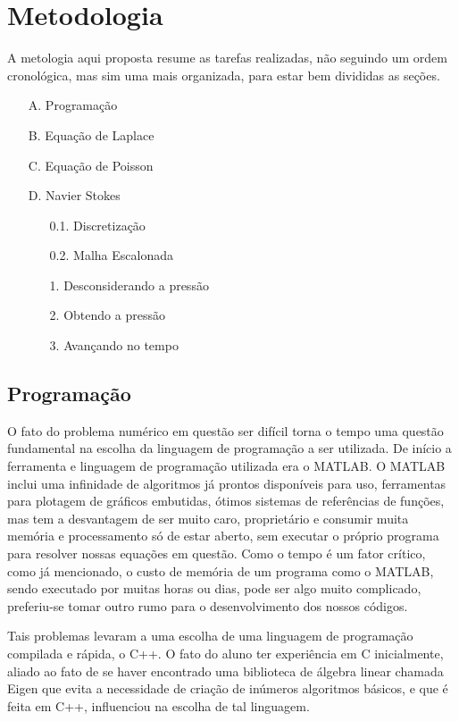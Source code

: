 \documentclass[journal]{IEEEtran}
\begin{document}
\section{Metodologia}
A metologia aqui proposta resume as tarefas realizadas, não seguindo um ordem cronológica, mas sim uma mais organizada, para estar bem divididas as seções.
\begin{enumerate}
  \item[A.] Programação
  \item[B.] Equação de Laplace
  \item[C.] Equação de Poisson
  \item[D.] Navier Stokes
  \begin{enumerate}
  \item [0.1.] Discretização
  \item[0.2.] Malha Escalonada
  \item[1.] Desconsiderando a pressão
  \item[2.] Obtendo a pressão
  \item[3.] Avançando no tempo
  \end{enumerate}
\end{enumerate}
\subsection{Programação}
O fato do problema numérico em questão ser difícil torna o tempo uma questão fundamental na escolha da linguagem de programação a ser utilizada. De início a ferramenta e linguagem de programação utilizada era o MATLAB\textregistered. O MATLAB inclui uma infinidade de algoritmos já prontos disponíveis para uso, ferramentas para plotagem de gráficos embutidas, ótimos sistemas de referências de funções, mas tem a desvantagem de ser muito caro, proprietário e consumir muita memória e processamento só de estar aberto, sem executar o próprio programa para resolver nossas equações em questão. Como o tempo é um fator crítico, como já mencionado, o custo de memória de um programa como o MATLAB, sendo executado por muitas horas ou dias, pode ser algo muito complicado, preferiu-se tomar outro rumo para o desenvolvimento dos nossos códigos.

Tais problemas levaram a uma escolha de uma linguagem de programação compilada e rápida, o C++. O fato do aluno ter experiência em C inicialmente, aliado ao fato de se haver encontrado uma biblioteca de álgebra linear chamada Eigen que evita a necessidade de criação de inúmeros algoritmos básicos, e que é feita em C++, influenciou na escolha de tal linguagem.
\end{document}
